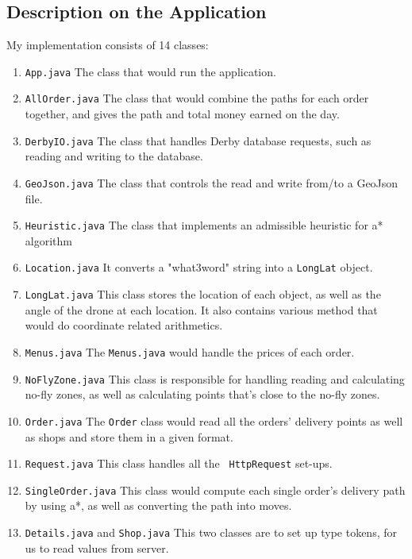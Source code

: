 \documentclass[a4paper,article,fontsize=15pt]{scrartcl}
\numberwithin{equation}{section}		%
\numberwithin{figure}{section}			%
\numberwithin{table}{section}				%
\begin{document}
    \subsection{Description on the Application}
    My implementation consists of 14 classes:
    \begin{enumerate}
        \item \verb|App.java| The class that would run the application.
        \item \verb|AllOrder.java| The class that would combine the paths for each order together, 
		and gives the path and total money earned on the day.
        \item \verb|DerbyIO.java| The class that handles Derby database requests, such as reading and writing to the database.
        \item \verb|GeoJson.java| The class that controls the read and write from/to a GeoJson file.
        \item \verb|Heuristic.java| The class that implements an admissible heuristic for a* algorithm
        \item \verb|Location.java| It converts a "what3word" string into a \verb |LongLat| object.
        \item \verb|LongLat.java| This class stores the location of each object, 
		as well as the angle of the drone at each location. It also contains various method that would do 
		coordinate related arithmetics.
        \item \verb|Menus.java|  The \verb|Menus.java| would handle the prices of each order.
        \item \verb|NoFlyZone.java| This class is responsible for handling reading and calculating no-fly zones,
					as well as calculating points that's close to the no-fly zones.
        \item \verb|Order.java| The \verb |Order| class would read all the orders' delivery points as well as shops
									and store them in a given format.
        \item \verb|Request.java| This class handles all the \verb| HttpRequest| set-ups.
        \item \verb|SingleOrder.java| This class would compute each single order's delivery path by using a*, 
		as well as converting the path into moves.
        \item \verb|Details.java| and \verb|Shop.java| This two classes are to set up type tokens, for us to read
									values from server.
    \end{enumerate}
    
\end{document}
